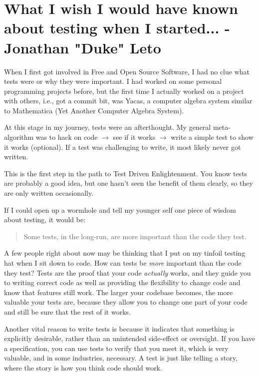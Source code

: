 \chapter{What I wish I would have known about testing when I started... - Jonathan "Duke" Leto}

When I first got involved in Free and Open Source Software, I had no clue what tests were or why they were important. I had worked on some personal programming projects before, but the first time I actually worked on a project with others, i.e., got a commit bit, was Yacas, a computer algebra system similar to Mathematica (Yet Another Computer Algebra System).

At this stage in my journey, tests were an afterthought. My general meta-algorithm was to hack on code $\rightarrow$ see if it works $\rightarrow$ write a simple test to show it works (optional). If a test was challenging to write, it most likely never got written.

This is the first step in the path to Test Driven Enlightenment. You know tests are probably a good idea, but one hasn't seen the benefit of them clearly, so they are only written occasionally.

If I could open up a wormhole and tell my younger self one piece of wisdom about testing, it would be:
\begin{quote}
Some tests, in the long-run, are more important than the code they test.                                                                        \end{quote}

A few people right about now may be thinking that I put on my tinfoil testing hat when I sit down to code. How can tests be \emph{more} important than the code they test? Tests are the proof that your code \emph{actually} works, and they guide you to writing correct code as well as providing the flexibility to change code and know that features still work. The larger your codebase becomes, the more valuable your tests are, because they allow you to change one part of your code and still be sure that the rest of it works.

Another vital reason to write tests is because it indicates that something is explicitly desirable, rather than an unintended side-effect or oversight. If you have a specification, you can use tests to verify that you meet it, which is very valuable, and in some industries, necessary. A test is just like telling a story, where the story is how you think code should work.

